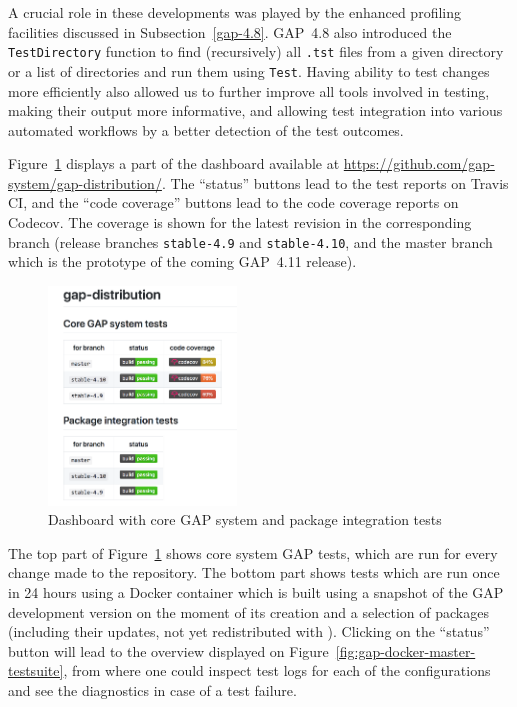 \documentclass{deliverablereport}
\begin{document}
A crucial role in these developments was played by the enhanced
profiling facilities discussed 
in Subsection~\ref{gap-4.8}. 
GAP~4.8 also introduced the {\tt TestDirectory} function to find
(recursively) all {\tt .tst} files from a given directory or a list of 
directories and run them using {\tt Test}. Having ability to test
changes more efficiently also allowed us to further improve all 
tools involved in testing, making their output more informative,
and allowing test integration into various automated workflows
by a better detection of the test outcomes. %


Figure~\ref{fig:gap-core-tests} displays a part of the dashboard
available at \url{https://github.com/gap-system/gap-distribution/}.
The ``status'' buttons lead to the test reports on Travis CI, and
the ``code coverage'' buttons lead to the code coverage reports on
Codecov. The coverage is shown for the latest revision in the
corresponding branch (release branches {\tt stable-4.9} and {\tt stable-4.10},
and the master branch which is the prototype of the coming GAP~4.11 release).

\begin{figure}[!ht]
    \centering
    \includegraphics[width=5cm]{images/gap-core-tests}
    \caption{Dashboard with core GAP system and package integration tests}
    \label{fig:gap-core-tests}
\end{figure}

The top part of Figure~\ref{fig:gap-core-tests} shows core system GAP tests,
which are run for every change made to the repository. The bottom part shows
tests which are run once in 24 hours using a Docker container which is built
using a snapshot of the GAP development version on the moment of its creation
and a selection of \GAP packages (including their updates, not yet redistributed
with \GAP). Clicking on the ``status'' button will lead to the overview displayed
on Figure~\ref{fig:gap-docker-master-testsuite}, from where one could inspect
test logs for each of the configurations and see the diagnostics in case of a
test failure.
\end{document}
